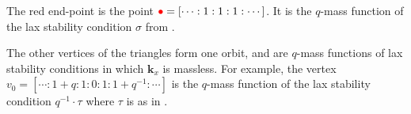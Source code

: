 \documentclass{amsart}
\begin{document}
The red end-point is the point \(\textcolor{red}{\bullet} = [\cdots : 1 : 1 : 1 : \cdots]\).
It is the \(q\)-mass function of the lax stability condition \(\sigma\) from .

The other vertices of the triangles form one orbit, and are \(q\)-mass functions of lax stability conditions in which \(\mathbf{k}_x\) is massless.
For example, the vertex \(v_0 = [ \cdots: 1+q : 1 : 0 : 1 : 1+q^{-1} : \cdots ]\) is the \(q\)-mass function of the lax stability condition \(q^{-1} \cdot \tau\) where \(\tau\) is as in .




\end{document}
